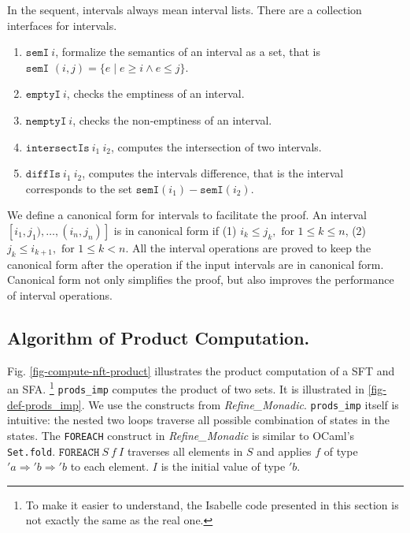 \documentclass[a4paper,UKenglish,cleveref, autoref, anonymous, thm-restate]{lipics-v2021}
\begin{document}
In the sequent, intervals always mean interval lists.
There are a collection interfaces for intervals. 
\begin{enumerate}
  \item $\texttt{semI}~i$, formalize the semantics of an interval as a set, that is $\texttt{semI }(i,j) = \{e \mid e \geq i \land e \leq j\}$.
  \item $\texttt{emptyI}~i$, checks the emptiness of an interval.
   \item $\texttt{nemptyI}~i$, checks the non-emptiness of an interval.
  \item $\texttt{intersectIs}~i_1~i_2$, computes the intersection of two intervals.
  \item $\texttt{diffIs}~i_1~i_2$, computes the intervals difference, that is the interval corresponds to the set $\texttt{semI}(i_1)-\texttt{semI}(i_2)$.
\end{enumerate}

We define a canonical form for intervals to facilitate the proof. An interval $[i_1, j_1), \ldots, (i_n, j_n)]$ is in canonical form if 
(1) $i_k \leq j_k, \text{ for } 1 \leq k \leq n$,
(2) $j_k\leq i_{k+1}, \text{ for } 1 \leq k < n$.
All the interval operations are proved to keep the canonical form after the operation if the input intervals are in canonical form.
Canonical form not only simplifies the proof, but also improves the performance of interval operations.




\subsection{Algorithm of Product Computation.}

Fig. \ref{fig-compute-nft-product} illustrates the product computation of a SFT and an SFA. \footnote{To make it easier to understand, the Isabelle code presented in this section is not exactly the same as the real one.}
\texttt{prods\_imp} computes the product of two sets. It is illustrated in \ref{fig-def-prods_imp}. We use the constructs from \emph{Refine\_Monadic}. \texttt{prods\_imp} itself is intuitive: the nested two loops traverse all possible combination of states in the states. 
The \texttt{FOREACH} construct in \emph{Refine\_Monadic} is similar to OCaml's \texttt{Set.fold}. $\texttt{FOREACH}~S~f~I$ traverses all elements in $S$ and applies $f$ of type $'a \Rightarrow 'b \Rightarrow 'b$ to each element. $I$ is the initial value of type $'b$.
\end{document}
